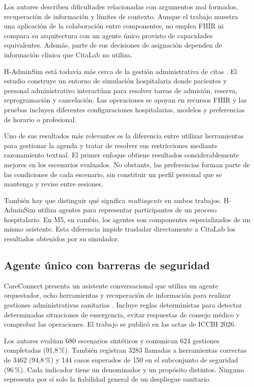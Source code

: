 Los autores describen dificultades relacionadas con argumentos mal formados, recuperación de información y límites de contexto. Aunque el trabajo muestra una aplicación de la colaboración entre componentes, no emplea FHIR ni compara su arquitectura con un agente único provisto de capacidades equivalentes. Además, parte de sus decisiones de asignación dependen de información clínica que CitaLab no utiliza.

H-AdminSim está todavía más cerca de la gestión administrativa de citas \citep{lee2026hadminsim}. El estudio construye un entorno de simulación hospitalaria donde pacientes y personal administrativo interactúan para resolver tareas de admisión, reserva, reprogramación y cancelación. Las operaciones se apoyan en recursos FHIR y las pruebas incluyen diferentes configuraciones hospitalarias, modelos y preferencias de horario o profesional.

Uno de sus resultados más relevantes es la diferencia entre utilizar herramientas para gestionar la agenda y tratar de resolver sus restricciones mediante razonamiento textual. El primer enfoque obtiene resultados considerablemente mejores en los escenarios evaluados. No obstante, las preferencias forman parte de las condiciones de cada escenario, sin constituir un perfil personal que se mantenga y revise entre sesiones.

También hay que distinguir qué significa \emph{multiagente} en ambos trabajos. H-AdminSim utiliza agentes para representar participantes de un proceso hospitalario. En M5, en cambio, los agentes son componentes especializados de un mismo asistente. Esta diferencia impide trasladar directamente a CitaLab los resultados obtenidos por su simulador.

\subsection{Agente único con barreras de seguridad}

CareConnect presenta un asistente conversacional que utiliza un agente orquestador, ocho herramientas y recuperación de información para realizar gestiones administrativas sanitarias \citep{hasan2026careconnect}. Incluye reglas deterministas para detectar determinadas situaciones de emergencia, evitar respuestas de consejo médico y comprobar las operaciones. El trabajo se publicó en las actas de ICCBI 2026.

Los autores evalúan 680 escenarios sintéticos y comunican 624 gestiones completadas (91,8\,\%). También registran 3283 llamadas a herramientas correctas de 3462 (94,8\,\%) y 144 casos superados de 150 en el subconjunto de seguridad (96\,\%). Cada indicador tiene un denominador y un propósito distintos. Ninguno representa por sí solo la fiabilidad general de un despliegue sanitario.

